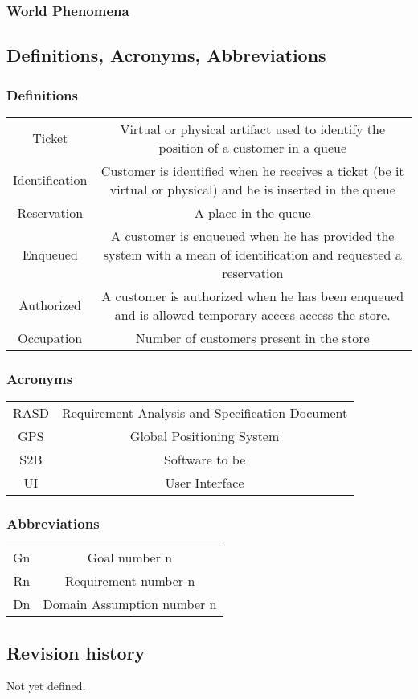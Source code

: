 \subsubsection{World Phenomena}
\subsection{Definitions, Acronyms, Abbreviations}
\subsubsection{Definitions}
\begin{tabular}{ c c }
	Ticket & Virtual or physical artifact used to identify the position of a customer in a queue \\
	Identification & Customer is identified when he receives a ticket (be it virtual or physical) and he is inserted in the queue\\
	Reservation & A place in the queue\\
	Enqueued & A customer is enqueued when he has provided the system with a mean of identification and requested a reservation\\
	Authorized & A customer is authorized when he has been enqueued and is allowed temporary access access the store.\\
	Occupation & Number of customers present in the store
\end{tabular}
\subsubsection{Acronyms}
\begin{tabular}{ c c }
	RASD & Requirement Analysis and Specification Document \\
	GPS & Global Positioning System \\
	S2B & Software to be \\
	UI & User Interface
\end{tabular}
\subsubsection{Abbreviations}
\begin{tabular}{ c c }
	Gn & Goal number n \\
	Rn & Requirement number n \\
	Dn & Domain Assumption number n
\end{tabular}
\subsection{Revision history}
Not yet defined.

